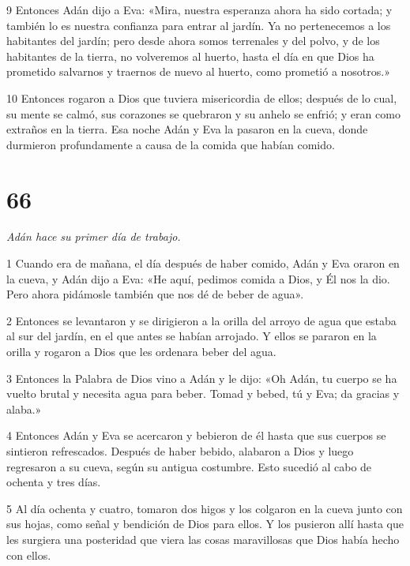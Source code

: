 \par 9 Entonces Adán dijo a Eva: «Mira, nuestra esperanza ahora ha sido cortada; y también lo es nuestra confianza para entrar al jardín. Ya no pertenecemos a los habitantes del jardín; pero desde ahora somos terrenales y del polvo, y de los habitantes de la tierra, no volveremos al huerto, hasta el día en que Dios ha prometido salvarnos y traernos de nuevo al huerto, como prometió a nosotros.»

\par 10 Entonces rogaron a Dios que tuviera misericordia de ellos; después de lo cual, su mente se calmó, sus corazones se quebraron y su anhelo se enfrió; y eran como extraños en la tierra. Esa noche Adán y Eva la pasaron en la cueva, donde durmieron profundamente a causa de la comida que habían comido.

\chapter{66}

\par \textit{Adán hace su primer día de trabajo.}

\par 1 Cuando era de mañana, el día después de haber comido, Adán y Eva oraron en la cueva, y Adán dijo a Eva: «He aquí, pedimos comida a Dios, y Él nos la dio. Pero ahora pidámosle también que nos dé de beber de agua».

\par 2 Entonces se levantaron y se dirigieron a la orilla del arroyo de agua que estaba al sur del jardín, en el que antes se habían arrojado. Y ellos se pararon en la orilla y rogaron a Dios que les ordenara beber del agua.

\par 3 Entonces la Palabra de Dios vino a Adán y le dijo: «Oh Adán, tu cuerpo se ha vuelto brutal y necesita agua para beber. Tomad y bebed, tú y Eva; da gracias y alaba.»

\par 4 Entonces Adán y Eva se acercaron y bebieron de él hasta que sus cuerpos se sintieron refrescados. Después de haber bebido, alabaron a Dios y luego regresaron a su cueva, según su antigua costumbre. Esto sucedió al cabo de ochenta y tres días.

\par 5 Al día ochenta y cuatro, tomaron dos higos y los colgaron en la cueva junto con sus hojas, como señal y bendición de Dios para ellos. Y los pusieron allí hasta que les surgiera una posteridad que viera las cosas maravillosas que Dios había hecho con ellos.

